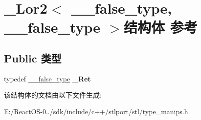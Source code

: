 \hypertarget{struct___lor2_3_01____false__type_00_01____false__type_01_4}{}\section{\+\_\+\+Lor2$<$ \+\_\+\+\_\+false\+\_\+type, \+\_\+\+\_\+false\+\_\+type $>$结构体 参考}
\label{struct___lor2_3_01____false__type_00_01____false__type_01_4}
\subsection*{Public 类型}
\begin{DoxyCompactItemize}
\item 
\mbox{\label{struct___lor2_3_01____false__type_00_01____false__type_01_4_a9b9d00165a519121e0bb183ff64cb69d}} 
typedef \hyperlink{struct____false__type}{\+\_\+\+\_\+false\+\_\+type} {\bfseries \+\_\+\+Ret}
\end{DoxyCompactItemize}


该结构体的文档由以下文件生成\+:\begin{DoxyCompactItemize}
\item 
E\+:/\+React\+O\+S-\/0../sdk/include/c++/stlport/stl/type\+\_\+manips.\+h\end{DoxyCompactItemize}
